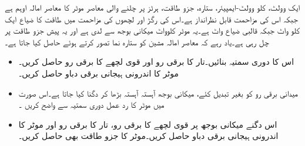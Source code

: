 %
ایک  وولٹ،  کلو وولٹ-ایمپیئر، ستارہ،  جزو طاقت،  ہرٹز پر چلنے والی معاصر موٹر کا معاصر امالہ  اوہم  ہے جبکہ اس کی مزاحمت قابل نظرانداز ہے۔اس کی رگڑ اور لچھوں کی مزاحمت میں طاقت کا ضیاع ایک کلو واٹ جبکہ قالبی ضیاع  واٹ ہے۔یہ موٹر   کلوواٹ میکانی بوجھ سے لدی  ہے اور یہ   پیش جزو طاقت   پر چل رہی ہے۔یاد رہے کہ معاصر امالہ مشین کو ستارہ نما تصور کرتے ہوئے حاصل کیا جاتا ہے۔ 
\begin{itemize}
\item
اس کا دوری سمتیہ بنائیں۔تار کا برقی رو  اور قوی لچھے کا برقی رو   حاصل کریں۔موٹر کا اندرونی ہیجانی برقی دباو  حاصل کریں۔
\item
میدانی برقی رو کو بغیر تبدیل کئے،  میکانی بوجھ آہستہ آہستہ بڑھا کر دگنا کیا جاتا ہے۔اس صورت میں موٹر کا رد عمل دوری سمتیہ سے واضح کریں ۔
\item
اس دگنے میکانی بوجھ پر قوی لچھے  کا برقی رو،  تار کا برقی رو  اور موٹر کا اندرونی ہیجانی برقی دباو حاصل کریں۔موٹر کا جزو طاقت بھی حاصل کریں۔
\end{itemize}


